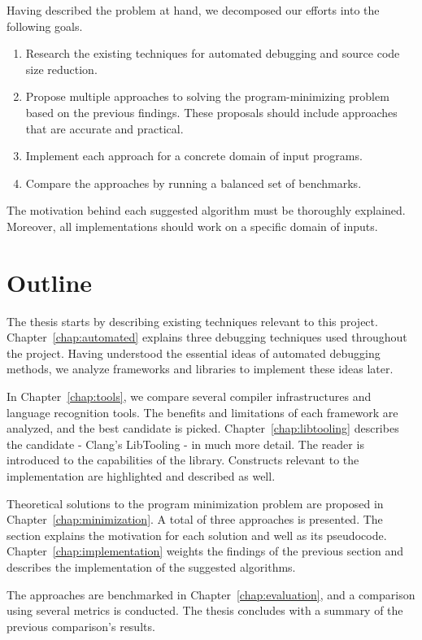 Having described the problem at hand, we decomposed our efforts into 
the following goals.
\begin{enumerate}
  \item Research the existing techniques for automated debugging and source 
  code size reduction.
  \item Propose multiple approaches to solving the program-minimizing problem based 
  on the previous findings. 
  These proposals should include approaches that are accurate and practical.
  \item Implement each approach for a concrete domain of input programs.
  \item Compare the approaches by running a balanced set of benchmarks.
\end{enumerate}
The motivation behind each suggested algorithm must be thoroughly explained. 
Moreover, all implementations should work on a specific domain of inputs.

\section{Outline}

The thesis starts by describing existing techniques relevant to this project. 
Chapter~\ref{chap:automated} explains three debugging techniques used 
throughout the project. 
Having understood the essential ideas of automated debugging methods, we 
analyze frameworks and libraries to implement these ideas later. 

In Chapter~\ref{chap:tools}, we compare several compiler infrastructures and 
language recognition tools. 
The benefits and limitations of each framework are analyzed, and the best 
candidate is picked. 
Chapter~\ref{chap:libtooling} describes the candidate - Clang's LibTooling - 
in much more detail. 
The reader is introduced to the capabilities of the library. 
Constructs relevant to the implementation are highlighted and described as 
well. 

Theoretical solutions to the program minimization problem are proposed in 
Chapter~\ref{chap:minimization}.
A total of three approaches is presented. 
The section explains the motivation for each solution and well as its 
pseudocode. 
Chapter~\ref{chap:implementation} weights the findings of the previous 
section and describes the implementation of the suggested algorithms. 

The approaches are benchmarked in Chapter~\ref{chap:evaluation}, and 
a comparison using several metrics is conducted. 
The thesis concludes with a summary of the previous comparison's results.

